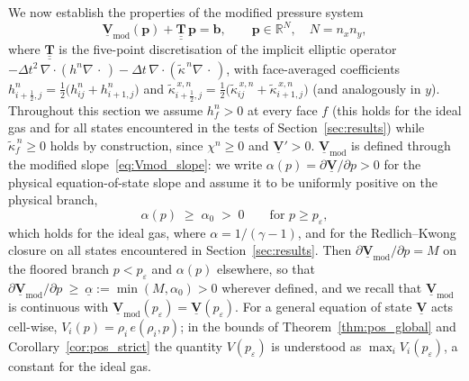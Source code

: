 \documentclass[a4paper,fleqn]{cas-sc}
\theoremstyle{definition}
\theoremstyle{remark}
\begin{document}
We now establish the properties of the modified pressure system
\begin{equation}
\label{eq:pos_sys}
\underline{\mathbf{V}}_{\mathrm{mod}}(\mathbf{p})
+\underline{\underline{\mathbf{T}}}\,\mathbf{p}=\mathbf{b},
\qquad \mathbf{p}\in\mathbb{R}^{N},\quad N=n_x n_y,
\end{equation}
where $\underline{\underline{\mathbf{T}}}$ is the five-point discretisation of the implicit
elliptic operator
$-\Delta t^{2}\,\nabla\!\cdot(h^{n}\nabla\,\cdot\,)
 -\Delta t\,\nabla\!\cdot(\tilde{\kappa}^{\,n}\nabla\,\cdot\,)$,
with face-averaged coefficients
$h^{n}_{i+\frac12,j}=\tfrac12\bigl(h^{n}_{ij}+h^{n}_{i+1,j}\bigr)$ and
$\tilde{\kappa}^{\,x,n}_{i+\frac12,j}
 =\tfrac12\bigl(\tilde{\kappa}^{\,x,n}_{ij}+\tilde{\kappa}^{\,x,n}_{i+1,j}\bigr)$
(and analogously in $y$). Throughout this section we assume $h^{n}_{f}>0$ at
every face $f$ (this holds for the ideal gas and for all states encountered
in the tests of Section~\ref{sec:results}) while $\tilde{\kappa}^{\,n}_{f}\ge 0$ holds by
construction, since $\chi^{n}\ge 0$ and $\underline{\mathbf{V}}'>0$.
$\underline{\mathbf{V}}_{\mathrm{mod}}$ is defined through the modified
slope~\eqref{eq:Vmod_slope}: we write
$\alpha(p)=\partial\underline{\mathbf{V}}/\partial p>0$ for the physical
equation-of-state slope and assume it to be uniformly positive on the
physical branch,
\begin{equation}
\label{equ:alpha0}
\alpha(p)\;\ge\;\alpha_0\;>\;0
\qquad\text{for } p\ge p_{\varepsilon},
\end{equation}
which holds for the ideal gas, where $\alpha=1/(\gamma-1)$, and for the
Redlich--Kwong closure on all states encountered in Section~\ref{sec:results}. Then
$\partial\underline{\mathbf{V}}_{\mathrm{mod}}/\partial p=M$ on the floored branch
$p<p_{\varepsilon}$ and $\alpha(p)$ elsewhere, so that
$\partial\underline{\mathbf{V}}_{\mathrm{mod}}/\partial p\ \ge\
\underline{\alpha}:=\min(M,\alpha_0)>0$ wherever defined, and we recall that
$\underline{\mathbf{V}}_{\mathrm{mod}}$ is continuous with
$\underline{\mathbf{V}}_{\mathrm{mod}}(p_{\varepsilon})
=\underline{\mathbf{V}}(p_{\varepsilon})$. For a general equation of state $\underline{\mathbf{V}}$ acts cell-wise,
$V_{i}(p)=\rho_{i}\,e(\rho_{i},p)$; in the bounds of
Theorem~\ref{thm:pos_global} and Corollary~\ref{cor:pos_strict} the
quantity $V(p_{\varepsilon})$ is understood as
$\max_{i}V_{i}(p_{\varepsilon})$, a constant for the ideal gas.
\end{document}
